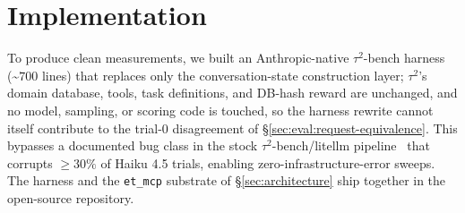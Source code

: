 \section{Implementation}
\label{sec:implementation}

To produce clean measurements, we built an Anthropic-native
$\tau^2$-bench harness (\textasciitilde$700$ lines) that replaces
only the conversation-state construction layer; $\tau^2$'s domain
database, tools, task definitions, and DB-hash reward are
unchanged, and no model, sampling, or scoring code is touched, so
the harness rewrite cannot itself contribute to the trial-$0$
disagreement of \S\ref{sec:eval:request-equivalence}. This bypasses a documented bug class in the stock
$\tau^2$-bench/litellm
pipeline~\cite{litellmissue12404,litellmissue15322} that corrupts
$\geq 30\%$ of Haiku 4.5 trials, enabling zero-infrastructure-error
sweeps. The harness and the \texttt{et\_mcp} substrate of
\S\ref{sec:architecture} ship together in the open-source
repository.
